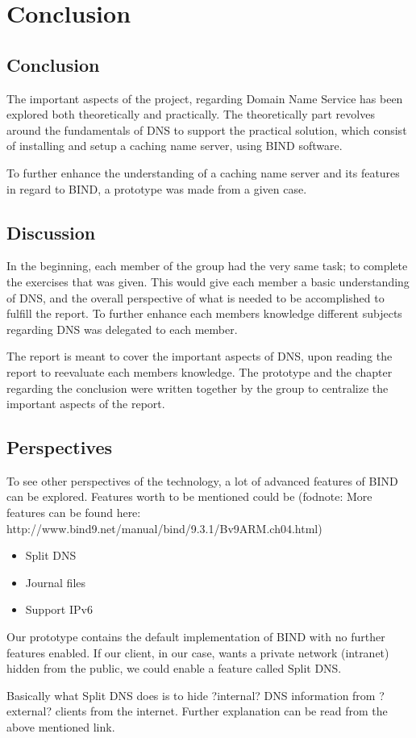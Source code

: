 \chapter{Conclusion}
\section{Conclusion}
The important aspects of the project, regarding Domain Name Service has been explored both theoretically and practically.  The theoretically part revolves around the fundamentals of DNS to support the practical solution, which consist of installing and setup a caching name server, using BIND software.

To further enhance the understanding of a caching name server and its features in regard to BIND, a prototype was made from a given case.

\section{Discussion}

In the beginning, each member of the group had the very same task; to complete the exercises that was given. This would give each member a basic understanding of DNS, and the overall perspective of what is needed to be accomplished to fulfill the report.
To further enhance each members knowledge different subjects regarding DNS was delegated to each member.

The report is meant to cover the important aspects of DNS, upon reading the report to reevaluate each members knowledge. The prototype and the chapter regarding the conclusion were written together by the group to centralize the important aspects of the report. 
\section{Perspectives}

To see other perspectives of the technology, a lot of advanced features of BIND can be explored. Features worth to be mentioned could be (fodnote: More features can be found here: http://www.bind9.net/manual/bind/9.3.1/Bv9ARM.ch04.html)

\begin{itemize}
  \item Split DNS
  \item Journal files
  \item Support IPv6
\end{itemize}

Our prototype contains the default implementation of BIND with no further features enabled. If our client, in our case, wants a private network (intranet) hidden from the public, we could enable a feature called Split DNS.

Basically what Split DNS does is to hide ?internal? DNS information from ?external? clients from the internet. Further explanation can be read from the above mentioned link.